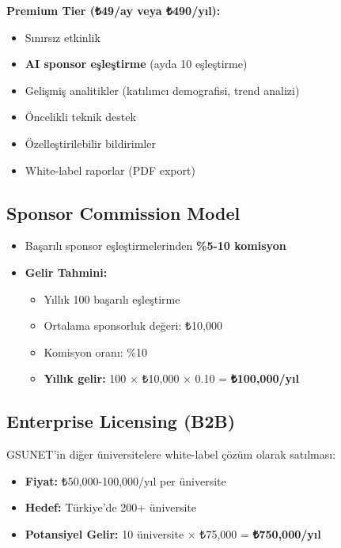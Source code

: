 \documentclass[a4paper,12pt]{report}
\begin{document}
\textbf{Premium Tier (₺49/ay veya ₺490/yıl):}
\begin{itemize}
    \item Sınırsız etkinlik
    \item \textbf{AI sponsor eşleştirme} (ayda 10 eşleştirme)
    \item Gelişmiş analitikler (katılımcı demografisi, trend analizi)
    \item Öncelikli teknik destek
    \item Özelleştirilebilir bildirimler
    \item White-label raporlar (PDF export)
\end{itemize}

\subsection{Sponsor Commission Model}

\begin{itemize}
    \item Başarılı sponsor eşleştirmelerinden \textbf{\%5-10 komisyon}
    \item \textbf{Gelir Tahmini:}
    \begin{itemize}
        \item Yıllık 100 başarılı eşleştirme
        \item Ortalama sponsorluk değeri: ₺10,000
        \item Komisyon oranı: \%10
        \item \textbf{Yıllık gelir:} 100 × ₺10,000 × 0.10 = \textbf{₺100,000/yıl}
    \end{itemize}
\end{itemize}

\subsection{Enterprise Licensing (B2B)}

GSUNET'in diğer üniversitelere white-label çözüm olarak satılması:

\begin{itemize}
    \item \textbf{Fiyat:} ₺50,000-100,000/yıl per üniversite
    \item \textbf{Hedef:} Türkiye'de 200+ üniversite
    \item \textbf{Potansiyel Gelir:} 10 üniversite × ₺75,000 = \textbf{₺750,000/yıl}
\end{itemize}
\end{document}
